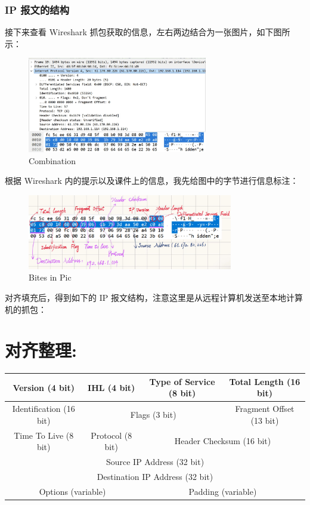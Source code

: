 \documentclass[14pt,a4paper,UTF8,twoside]{article}
\begin{document}
\subsubsection{IP 报文的结构}

接下来查看 Wireshark 抓包获取的信息，左右两边结合为一张图片，如下图所示：

\begin{figure}[H]
  \centering
  \includegraphics[width=0.7\textwidth]{lab3/combina.jpg}
  \caption{Combination}
\end{figure}

根据 Wireshark 内的提示以及课件上的信息，我先给图中的字节进行信息标注：

\begin{figure}[H]
  \centering
  \includegraphics[width=0.8\textwidth]{lab3/result.jpg}
  \caption{Bites in Pic}
\end{figure}

对齐填充后，得到如下的 IP 报文结构，注意这里是从远程计算机发送至本地计算机的抓包：

\section*{对齐整理:}

\begin{center}
\setlength{\extrarowheight}{2pt}
\begin{tabular}{|c|c|c|c|}
\hline
Version (4 bit) & IHL (4 bit) & Type of Service (8 bit) & Total Length (16 bit) \\ 
\hline
Identification (16 bit) & \multicolumn{2}{c|}{Flags (3 bit)} & Fragment Offset (13 bit) \\ 
\hline
Time To Live (8 bit) & Protocol (8 bit) & \multicolumn{2}{c|}{Header Checksum (16 bit)} \\ 
\hline
\multicolumn{4}{|c|}{Source IP Address (32 bit)} \\ 
\hline
\multicolumn{4}{|c|}{Destination IP Address (32 bit)} \\ 
\hline
\multicolumn{2}{|c|}{Options (variable)} & \multicolumn{2}{c|}{Padding (variable)} \\ 
\hline
\end{tabular}
\end{center}
\end{document}
